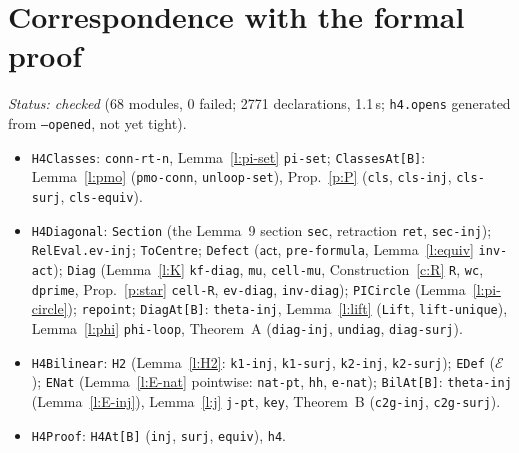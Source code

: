 \documentclass[11pt]{amsart}
\theoremstyle{definition}
\theoremstyle{remark}
\newcommand{\code}[1]{\texttt{#1}}
\begin{document}
\section{Correspondence with the formal proof}\label{sec:corr}
\emph{Status: checked} (68 modules, 0 failed; 2771 declarations, 1.1\,s;
\code{h4.opens} generated from \code{--opened}, not yet tight).
\begin{itemize}
\item \code{H4Classes}: \code{conn-rt-n}, Lemma~\ref{l:pi-set} \code{pi-set};
  \code{ClassesAt[B]}: Lemma~\ref{l:pmo} (\code{pmo-conn}, \code{unloop-set}),
  Prop.~\ref{p:P} (\code{cls}, \code{cls-inj}, \code{cls-surj}, \code{cls-equiv}).
\item \code{H4Diagonal}: \code{Section} (the Lemma~9 section \code{sec},
  retraction \code{ret}, \code{sec-inj}); \code{RelEval.ev-inj};
  \code{ToCentre}; \code{Defect} ($\mathsf{act}$, \code{pre-formula},
  Lemma~\ref{l:equiv} \code{inv-act}); \code{Diag} (Lemma~\ref{l:K}
  \code{kf-diag}, \code{mu}, \code{cell-mu}, Construction~\ref{c:R} \code{R},
  \code{wc}, \code{dprime}, Prop.~\ref{p:star} \code{cell-R},
  \code{ev-diag}, \code{inv-diag}); \code{PICircle} (Lemma~\ref{l:pi-circle});
  \code{repoint}; \code{DiagAt[B]}: \code{theta-inj}, Lemma~\ref{l:lift}
  (\code{Lift}, \code{lift-unique}), Lemma~\ref{l:phi} \code{phi-loop},
  Theorem~A (\code{diag-inj}, \code{undiag}, \code{diag-surj}).
\item \code{H4Bilinear}: \code{H2} (Lemma~\ref{l:H2}: \code{k1-inj},
  \code{k1-surj}, \code{k2-inj}, \code{k2-surj}); \code{EDef} ($\mathcal E$);
  \code{ENat} (Lemma~\ref{l:E-nat} pointwise: \code{nat-pt}, \code{hh},
  \code{e-nat}); \code{BilAt[B]}: \code{theta-inj} (Lemma~\ref{l:E-inj}),
  Lemma~\ref{l:j} \code{j-pt}, \code{key}, Theorem~B (\code{c2g-inj},
  \code{c2g-surj}).
\item \code{H4Proof}: \code{H4At[B]} (\code{inj}, \code{surj}, \code{equiv}),
  \code{h4}.
\end{itemize}
\end{document}
